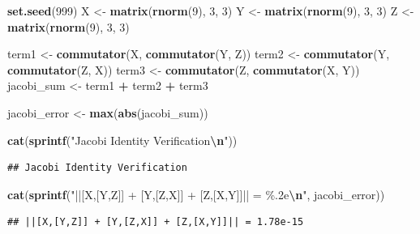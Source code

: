 \documentclass[
]{book}
\newenvironment{Shaded}{\begin{snugshade}}{\end{snugshade}}
\newcommand{\DecValTok}[1]{\textcolor[rgb]{0.00,0.00,0.81}{#1}}
\newcommand{\FunctionTok}[1]{\textcolor[rgb]{0.13,0.29,0.53}{\textbf{#1}}}
\newcommand{\NormalTok}[1]{#1}
\newcommand{\OtherTok}[1]{\textcolor[rgb]{0.56,0.35,0.01}{#1}}
\newcommand{\SpecialCharTok}[1]{\textcolor[rgb]{0.81,0.36,0.00}{\textbf{#1}}}
\newcommand{\StringTok}[1]{\textcolor[rgb]{0.31,0.60,0.02}{#1}}
\theoremstyle{definition}
\theoremstyle{definition}
\theoremstyle{definition}
\theoremstyle{definition}
\theoremstyle{remark}
\begin{document}
\begin{Shaded}
\begin{Highlighting}[]
\FunctionTok{set.seed}\NormalTok{(}\DecValTok{999}\NormalTok{)}
\NormalTok{X }\OtherTok{\textless{}{-}} \FunctionTok{matrix}\NormalTok{(}\FunctionTok{rnorm}\NormalTok{(}\DecValTok{9}\NormalTok{), }\DecValTok{3}\NormalTok{, }\DecValTok{3}\NormalTok{)}
\NormalTok{Y }\OtherTok{\textless{}{-}} \FunctionTok{matrix}\NormalTok{(}\FunctionTok{rnorm}\NormalTok{(}\DecValTok{9}\NormalTok{), }\DecValTok{3}\NormalTok{, }\DecValTok{3}\NormalTok{)}
\NormalTok{Z }\OtherTok{\textless{}{-}} \FunctionTok{matrix}\NormalTok{(}\FunctionTok{rnorm}\NormalTok{(}\DecValTok{9}\NormalTok{), }\DecValTok{3}\NormalTok{, }\DecValTok{3}\NormalTok{)}

\NormalTok{term1 }\OtherTok{\textless{}{-}} \FunctionTok{commutator}\NormalTok{(X, }\FunctionTok{commutator}\NormalTok{(Y, Z))}
\NormalTok{term2 }\OtherTok{\textless{}{-}} \FunctionTok{commutator}\NormalTok{(Y, }\FunctionTok{commutator}\NormalTok{(Z, X))}
\NormalTok{term3 }\OtherTok{\textless{}{-}} \FunctionTok{commutator}\NormalTok{(Z, }\FunctionTok{commutator}\NormalTok{(X, Y))}
\NormalTok{jacobi\_sum }\OtherTok{\textless{}{-}}\NormalTok{ term1 }\SpecialCharTok{+}\NormalTok{ term2 }\SpecialCharTok{+}\NormalTok{ term3}

\NormalTok{jacobi\_error }\OtherTok{\textless{}{-}} \FunctionTok{max}\NormalTok{(}\FunctionTok{abs}\NormalTok{(jacobi\_sum))}

\FunctionTok{cat}\NormalTok{(}\FunctionTok{sprintf}\NormalTok{(}\StringTok{"Jacobi Identity Verification}\SpecialCharTok{\textbackslash{}n}\StringTok{"}\NormalTok{))}
\end{Highlighting}
\end{Shaded}

\begin{verbatim}
## Jacobi Identity Verification
\end{verbatim}

\begin{Shaded}
\begin{Highlighting}[]
\FunctionTok{cat}\NormalTok{(}\FunctionTok{sprintf}\NormalTok{(}\StringTok{"||[X,[Y,Z]] + [Y,[Z,X]] + [Z,[X,Y]]|| = \%.2e}\SpecialCharTok{\textbackslash{}n}\StringTok{"}\NormalTok{, jacobi\_error))}
\end{Highlighting}
\end{Shaded}

\begin{verbatim}
## ||[X,[Y,Z]] + [Y,[Z,X]] + [Z,[X,Y]]|| = 1.78e-15
\end{verbatim}
\end{document}

